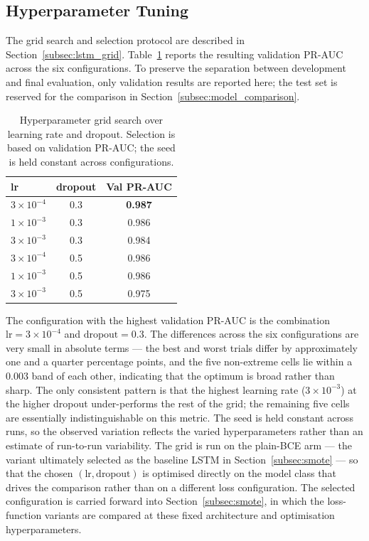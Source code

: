 \documentclass[oneside,12pt,parskip=half,american,numbers=noenddot]{scrreprt}
\begin{document}
\subsection{Hyperparameter Tuning}
\label{subsec:lstm_hpt}

The grid search and selection protocol are described in Section~\ref{subsec:lstm_grid}. Table~\ref{tab:lstm_hpt} reports the resulting validation PR-AUC across the six configurations. To preserve the separation between development and final evaluation, only validation results are reported here; the test set is reserved for the comparison in Section~\ref{subsec:model_comparison}.

\begin{table}[H]
\centering
\caption{Hyperparameter grid search over learning rate and dropout. Selection is based on validation PR-AUC; the seed is held constant across configurations.}
\label{tab:lstm_hpt}
\small
\renewcommand{\arraystretch}{1.2}
\begin{tabular}{lcc}
\hline
\textbf{lr} & \textbf{dropout} & \textbf{Val PR-AUC} \\
\hline
$3\times 10^{-4}$ & 0.3 & \textbf{0.987} \\
$1\times 10^{-3}$ & 0.3 & 0.986 \\
$3\times 10^{-3}$ & 0.3 & 0.984 \\
$3\times 10^{-4}$ & 0.5 & 0.986 \\
$1\times 10^{-3}$ & 0.5 & 0.986 \\
$3\times 10^{-3}$ & 0.5 & 0.975 \\
\hline
\end{tabular}
\end{table}

The configuration with the highest validation PR-AUC is the combination $\text{lr} = 3\times 10^{-4}$ and $\text{dropout} = 0.3$. The differences across the six configurations are very small in absolute terms — the best and worst trials differ by approximately one and a quarter percentage points, and the five non-extreme cells lie within a $0.003$ band of each other, indicating that the optimum is broad rather than sharp. The only consistent pattern is that the highest learning rate ($3\times 10^{-3}$) at the higher dropout under-performs the rest of the grid; the remaining five cells are essentially indistinguishable on this metric. The seed is held constant across runs, so the observed variation reflects the varied hyperparameters rather than an estimate of run-to-run variability. The grid is run on the plain-BCE arm — the variant ultimately selected as the baseline LSTM in Section~\ref{subsec:smote} — so that the chosen $(\text{lr}, \text{dropout})$ is optimised directly on the model class that drives the comparison rather than on a different loss configuration. The selected configuration is carried forward into Section~\ref{subsec:smote}, in which the loss-function variants are compared at these fixed architecture and optimisation hyperparameters.
\end{document}
